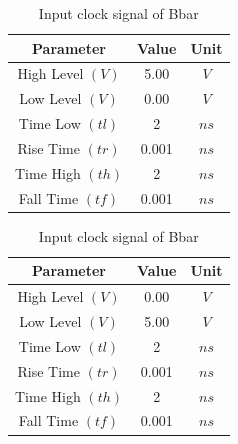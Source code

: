 \documentclass[a4paper,12pt]{article}
\begin{document}
\begin{table}[H]
		\begin{subtable}[t]{0.48\textwidth} %
			\centering
			\begin{tabular}{|c|c|c|}
				\hline
				\textbf{Parameter}          & \textbf{Value} & \textbf{Unit} \\ \hline
				High Level $(V)$            & 5.00           & $V$           \\ \hline
				Low Level $(V)$             & 0.00           & $V$           \\ \hline
				Time Low $(tl)$             & 2        & $ns$          \\ \hline
				Rise Time $(tr)$            & 0.001          & $ns$          \\ \hline
				Time High $(th)$            & 2          & $ns$          \\ \hline
				Fall Time $(tf)$            & 0.001          & $ns$          \\ \hline
			\end{tabular}
			
			\caption{Input clock signal of B} %
		\end{subtable}
		\hfil
		\begin{subtable}[t]{0.48\textwidth} %
			\centering
			\begin{tabular}{|c|c|c|}
				\hline
				\textbf{Parameter}          & \textbf{Value} & \textbf{Unit} \\ \hline
				High Level $(V)$            & 0.00           & $V$           \\ \hline
				Low Level $(V)$             & 5.00           & $V$           \\ \hline
				Time Low $(tl)$             & 2          & $ns$          \\ \hline
				Rise Time $(tr)$            & 0.001          & $ns$          \\ \hline
				Time High $(th)$            & 2         & $ns$          \\ \hline
				Fall Time $(tf)$            & 0.001          & $ns$          \\ \hline
			\end{tabular}
			
			\caption{Input clock signal of Bbar} %
		\end{subtable}
		

\end{table}
\end{document}

